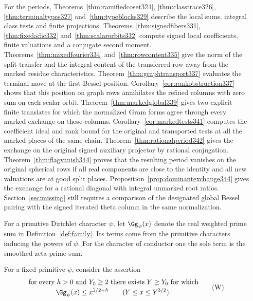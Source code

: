 \documentclass[a4paper,11pt]{article}
\theoremstyle{definition}
\theoremstyle{remark}
\numberwithin{equation}{section}
\begin{document}
For the periods, Theorems~\ref{thm:ramifiedcoset324}, \ref{thm:classtrace326}, \ref{thm:terminaltypes327} and~\ref{thm:typeblocks329} describe the local sums, integral class tests and finite projections. Theorems~\ref{thm:signedfibers331}, \ref{thm:fixedadic332} and~\ref{thm:scalarorbits332} compute signed local coefficients, finite valuations and a conjugate second moment. Theorems~\ref{thm:mixedfourier334} and~\ref{thm:rowcontent335} give the norm of the split transfer and the integral content of the transferred row away from the marked residue characteristics. Theorem~\ref{thm:graphtransport337} evaluates the terminal move at the first Bessel position. Corollary~\ref{cor:rankobstruction337} shows that this position on graph rows annihilates the refined columns with zero sum on each scalar orbit. Theorem~\ref{thm:markedglobal339} gives two explicit finite translates for which the normalized Gram forms agree through every marked exchange on those columns. Corollary~\ref{cor:markedtests341} computes the coefficient ideal and rank bound for the original and transported tests at all the marked places of the same chain. Theorem~\ref{thm:rationalperiod342} gives the exchange on the original signed auxiliary projector by rational conjugation. Theorem~\ref{thm:flagvanish344} proves that the resulting period vanishes on the original spherical rows if all real components are close to the identity and all new valuations are at good split places. Proposition~\ref{prop:dominantexchange344} gives the exchange for a rational diagonal with integral unmarked root ratios. Section~\ref{sec:missing} still requires a comparison of the designated global Bessel pairing with the signed iterated theta column in the same normalization.

For a primitive Dirichlet character \(\psi\), let \(\Gg_\psi(x)\) denote the real weighted prime sum in Definition~\ref{def:family}. Its terms come from the primitive characters inducing the powers of \(\psi\). For the character of conductor one the sole term is the smoothed zeta prime sum.

For a fixed primitive \(\psi\), consider the assertion
\begin{equation*}
 \begin{gathered}
 \text{for every }h>0\text{ and }Y_0\ge2\text{ there exists }Y\ge Y_0
 \text{ for which}\\[-2pt]
              \Gg_\psi(x)\le x^{1/2+h}\qquad(Y\le x\le Y^{3/2}).
 \end{gathered}                                                \tag{W}\label{eq:window}
\end{equation*}
\end{document}
